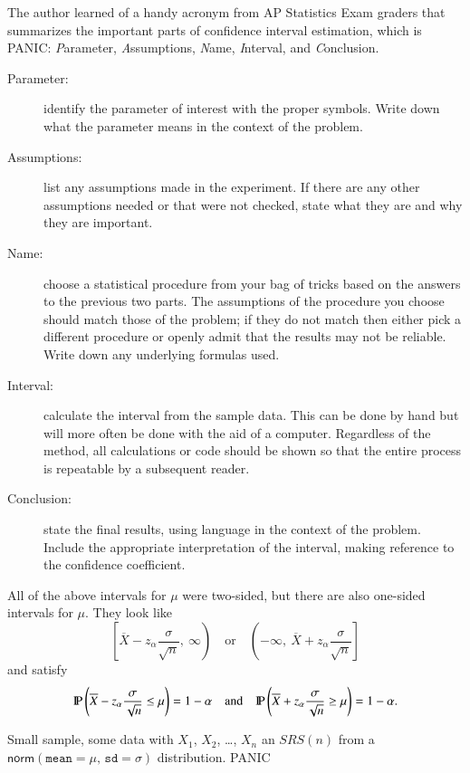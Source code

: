\documentclass[captions=tableheading]{scrbook}
\begin{document}
The author learned of a handy acronym from AP Statistics Exam graders that summarizes the important parts of confidence interval estimation, which is PANIC: \emph{P}arameter, \emph{A}ssumptions, \emph{N}ame, \emph{I}nterval, and \emph{C}onclusion.
\begin{description}
\item[Parameter:] identify the parameter of interest with the proper symbols. Write down what the parameter means in the context of the problem.
\item[Assumptions:] list any assumptions made in the experiment. If there are any other assumptions needed or that were not checked, state what they are and why they are important.
\item[Name:] choose a statistical procedure from your bag of tricks based on the answers to the previous two parts. The assumptions of the procedure you choose should match those of the problem; if they do not match then either pick a different procedure or openly admit that the results may not be reliable. Write down any underlying formulas used.
\item[Interval:] calculate the interval from the sample data. This can be done by hand but will more often be done with the aid of a computer. Regardless of the method, all calculations or code should be shown so that the entire process is repeatable by a subsequent reader.
\item[Conclusion:] state the final results, using language in the context of the problem. Include the appropriate interpretation of the interval, making reference to the confidence coefficient.
\end{description}

\begin{rem}
All of the above intervals for \(\mu\) were two-sided, but there are also one-sided intervals for \(\mu\). They look like
\begin{equation}
\left[\overline{X}-z_{\alpha}\frac{\sigma}{\sqrt{n}},\ \infty\right)\quad\mbox{or}\quad\left(-\infty,\ \overline{X}+z_{\alpha}\frac{\sigma}{\sqrt{n}}\right]
\end{equation}
and satisfy
\begin{equation}
\P\left(\overline{X}-z_{\alpha}\frac{\sigma}{\sqrt{n}}\leq\mu\right)=1-\alpha\quad\mbox{and}\quad\P\left(\overline{X}+z_{\alpha}\frac{\sigma}{\sqrt{n}}\geq\mu\right)=1-\alpha.
\end{equation}
\end{rem}


\begin{example}
Small sample, some data with \(X_{1}\), \(X_{2}\), \ldots{}, \(X_{n}\) an \(SRS(n)\) from a \(\mathsf{norm}(\mathtt{mean}=\mu,\,\mathtt{sd}=\sigma)\) distribution.  PANIC
\end{example}
\end{document}
